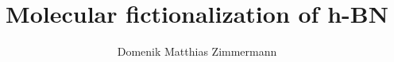 \author{Domenik Matthias Zimmermann}
\title{Molecular fictionalization of h-BN}

\usepackage[utf8]{inputenc}
\usepackage[T1]{fontenc}
\usepackage{lmodern}

\usepackage[english]{babel}
\usepackage{csquotes}
\usepackage{amsmath}
\usepackage{textcomp}		%
\usepackage{amsfonts}
\usepackage{amssymb}
\usepackage{graphicx}
\usepackage{braket}		%
\usepackage{siunitx}
\DeclareSIUnit{}
\usepackage[hidelinks,breaklinks=true]{hyperref}
\usepackage[section]{placeins} %
\usepackage{subfigure}
\usepackage{wrapfig}
\usepackage{caption}
\usepackage{microtype}
\usepackage{multicol}
\usepackage{multirow}
\usepackage{makeidx}
\makeindex
\usepackage[style=numeric,backend=biber,refsection=chapter]{biblatex} 	%
\addto\bibsetup{\setlength{\emergencystretch}{1.5em}} 	
%
%
\usepackage{xcolor}
\usepackage{fancyhdr}
\usepackage{titlesec}
\renewcommand{\footrulewidth}{1pt}
\setlength{\headheight}{15.2pt}
\renewcommand{\headrulewidth}{1pt}				%
\renewcommand{\sectionmark}[1]{\markright{#1}{}} \lhead[]{\leftmark} \rhead[\leftmark]{}

